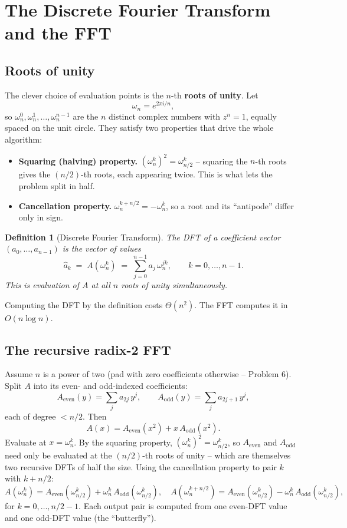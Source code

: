 \documentclass[11pt]{article}
\newtheorem{definition}[theorem]{Definition}
\begin{document}
\section{The Discrete Fourier Transform and the FFT}

\subsection{Roots of unity}

The clever choice of evaluation points is the $n$-th \textbf{roots of unity}. Let
\[
\omega_n = e^{2\pi i / n},
\]
so $\omega_n^0, \omega_n^1, \ldots, \omega_n^{n-1}$ are the $n$ distinct complex numbers with
$z^n = 1$, equally spaced on the unit circle. They satisfy two properties that drive the
whole algorithm:
\begin{itemize}
    \item \textbf{Squaring (halving) property.} $(\omega_n^k)^2 = \omega_{n/2}^k$ -- squaring
    the $n$-th roots gives the $(n/2)$-th roots, each appearing twice. This is what lets the
    problem split in half.
    \item \textbf{Cancellation property.} $\omega_n^{k + n/2} = -\omega_n^k$, so a root and
    its ``antipode'' differ only in sign.
\end{itemize}

\begin{definition}[Discrete Fourier Transform]
The \emph{DFT} of a coefficient vector $(a_0, \ldots, a_{n-1})$ is the vector of values
\[
\hat a_k \;=\; A(\omega_n^k) \;=\; \sum_{j=0}^{n-1} a_j\, \omega_n^{jk}, \qquad k = 0, \ldots, n-1.
\]
This is evaluation of $A$ at all $n$ roots of unity simultaneously.
\end{definition}

Computing the DFT by the definition costs $\Theta(n^2)$. The FFT computes it in
$O(n \log n)$.

\subsection{The recursive radix-2 FFT}

Assume $n$ is a power of two (pad with zero coefficients otherwise -- Problem 6). Split $A$
into its even- and odd-indexed coefficients:
\[
A_{\text{even}}(y) = \sum_{j} a_{2j}\, y^{j}, \qquad A_{\text{odd}}(y) = \sum_{j} a_{2j+1}\, y^{j},
\]
each of degree $< n/2$. Then
\[
A(x) = A_{\text{even}}(x^2) + x\, A_{\text{odd}}(x^2).
\]
Evaluate at $x = \omega_n^k$. By the squaring property, $(\omega_n^k)^2 = \omega_{n/2}^k$, so
$A_{\text{even}}$ and $A_{\text{odd}}$ need only be evaluated at the $(n/2)$-th roots of
unity -- which are themselves two recursive DFTs of half the size. Using the cancellation
property to pair $k$ with $k + n/2$:
\[
A(\omega_n^k) = A_{\text{even}}(\omega_{n/2}^k) + \omega_n^k\, A_{\text{odd}}(\omega_{n/2}^k),
\quad
A(\omega_n^{k + n/2}) = A_{\text{even}}(\omega_{n/2}^k) - \omega_n^k\, A_{\text{odd}}(\omega_{n/2}^k),
\]
for $k = 0, \ldots, n/2 - 1$. Each output pair is computed from one even-DFT value and one
odd-DFT value (the ``butterfly'').
\end{document}
